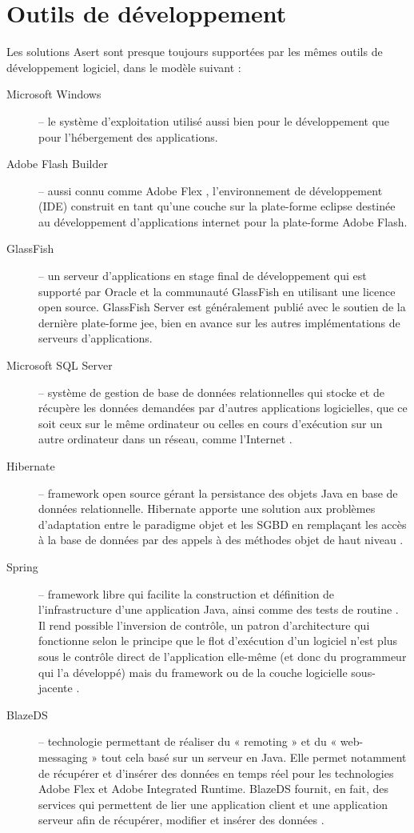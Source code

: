 \section{Outils de développement}\label{outils}

Les solutions Asert sont presque toujours supportées par les mêmes outils de développement logiciel, dans le modèle suivant :
\begin{description}
\item[Microsoft Windows] -- le système d'exploitation utilisé aussi bien pour le développement que pour l'hébergement des applications.
\item[Adobe Flash Builder] -- aussi connu comme Adobe Flex \cite{flex}, l'environnement de développement (IDE) construit en tant qu'une couche sur la plate-forme \Gls{eclipse} destinée au développement d'applications internet pour la plate-forme Adobe Flash.
\item[GlassFish] -- un serveur d'applications en stage final de développement qui est supporté par Oracle et la communauté GlassFish en utilisant une licence open source. GlassFish Server \cite{glassfish} est généralement publié avec le soutien de la dernière plate-forme \gls{jee}, bien en avance sur les autres implémentations de serveurs d'applications.
\item[Microsoft SQL Server] -- système de gestion de base de données relationnelles qui stocke et de récupère les données demandées par d'autres applications logicielles, que ce soit ceux sur le même ordinateur ou celles en cours d'exécution sur un autre ordinateur dans un réseau, comme l'Internet \cite{sql-server}.
\item[Hibernate] -- framework open source gérant la persistance des objets Java en base de données relationnelle. Hibernate apporte une solution aux problèmes d'adaptation entre le paradigme objet et les \gls{SGBD} en remplaçant les accès à la base de données par des appels à des méthodes objet de haut niveau \cite{hibernate}.
\item[Spring] -- framework libre qui facilite la construction et définition de l'infrastructure d'une application Java, ainsi comme des tests de routine \cite{spring}. Il rend possible l'inversion de contrôle, un patron d'architecture qui fonctionne selon le principe que le flot d'exécution d'un logiciel n'est plus sous le contrôle direct de l'application elle-même (et donc du programmeur qui l'a développé) mais du framework ou de la couche logicielle sous-jacente \cite{wiki-ioc}.
\item[BlazeDS] -- technologie permettant de réaliser du « remoting » et du « web-messaging » tout cela basé sur un serveur en Java. Elle permet notamment de récupérer et d'insérer des données en temps réel pour les technologies Adobe Flex et Adobe Integrated Runtime. BlazeDS fournit, en fait, des services qui permettent de lier une application client et une application serveur afin de récupérer, modifier et insérer des données \cite{blazeds}.

\end{description}
